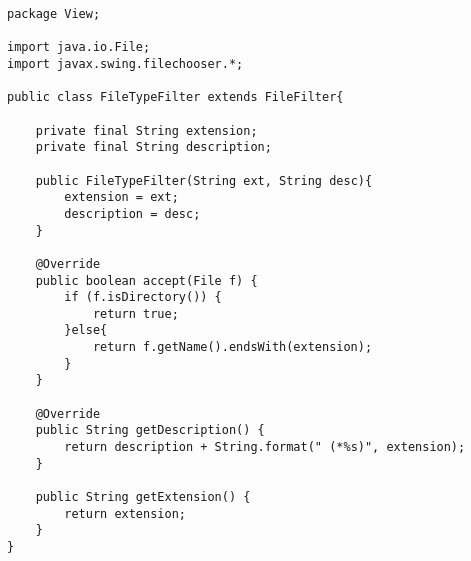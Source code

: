 \begin{lstlisting}[caption= FileTypeFilter.java]
package View;

import java.io.File;
import javax.swing.filechooser.*;

public class FileTypeFilter extends FileFilter{
    
    private final String extension;
    private final String description;
    
    public FileTypeFilter(String ext, String desc){
        extension = ext;
        description = desc;
    }
    
    @Override
    public boolean accept(File f) {
        if (f.isDirectory()) {
            return true;
        }else{
            return f.getName().endsWith(extension);
        }
    }

    @Override
    public String getDescription() {
        return description + String.format(" (*%s)", extension);
    }

    public String getExtension() {
        return extension;
    }
}
\end{lstlisting}

